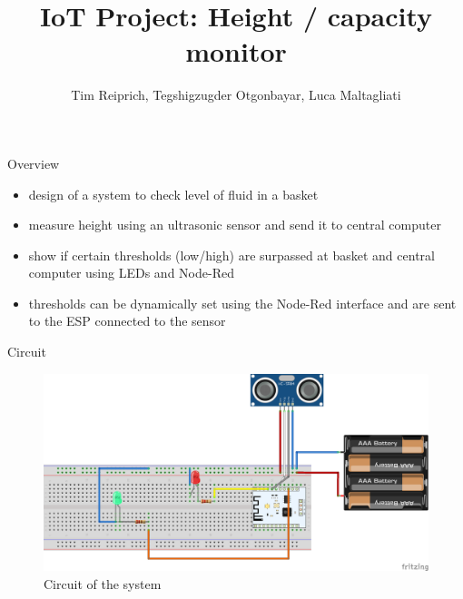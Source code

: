 \documentclass[11pt]{beamer}
\author{Tim Reiprich, Tegshigzugder Otgonbayar, Luca Maltagliati}
\title{IoT Project: Height / capacity monitor}
\begin{document}
\begin{frame}
\titlepage
\end{frame}



\begin{frame}{Overview}
\begin{itemize}
\item design of a system to check level of fluid in a basket
\item measure height using an ultrasonic sensor and send it to central computer
\item show if certain thresholds (low/high) are surpassed at basket and central computer using LEDs and Node-Red
\item thresholds can be dynamically set using the Node-Red interface and are sent to the ESP connected to the sensor
\end{itemize}
\end{frame}

\begin{frame}{Circuit}
\begin{figure}
\hspace*{-0.5cm}\includegraphics[scale=0.5]{pic/schema_bb.png}
\caption{Circuit of the system}
\label{schema_bb}
\end{figure}
\end{frame}
\end{document}
